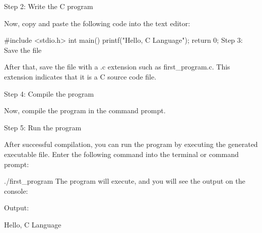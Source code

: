 \documentclass[11pt]{article}
\begin{document}
Step 2: Write the C program

Now, copy and paste the following code into the text editor:

#include <stdio.h>  
int main() {  
	printf("Hello, C Language");  
	return 0;  
}  
Step 3: Save the file

After that, save the file with a .c extension such as first_program.c. This extension indicates that it is a C source code file.

Step 4: Compile the program

Now, compile the program in the command prompt.

Step 5: Run the program

After successful compilation, you can run the program by executing the generated executable file. Enter the following command into the terminal or command prompt:

./first_program  
The program will execute, and you will see the output on the console:

Output:

Hello, C Language
\end{document}
